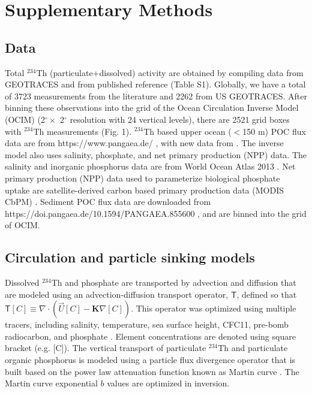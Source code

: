 \section{Supplementary Methods}
\label{sec:meth}

\subsection{Data}
Total $^{234}$Th (particulate+dissolved) activity are obtained by compiling data from GEOTRACES \citep{mawji2015,schlitzer2018} and from published reference (Table S1).
Globally, we have a total of 3723 measurements from the literature and 2262 from US GEOTRACES.
After binning these observations into the grid of the Ocean Circulation Inverse Model (OCIM) (2$^\circ\times$ 2$^\circ$ resolution with 24 vertical levels), there are 2521 grid boxes with $^{234}$Th measurements (Fig. 1).
$^{234}$Th based upper ocean ($<$150 m) POC flux data are from https://www.pangaea.de/ \citep{LeMoigne2013}, with new data from \citet{Black2017}.
The inverse model also uses salinity, phosphate, and net primary production (NPP) data.
The salinity and inorganic phosphorus data are from World Ocean Atlas 2013 \citep{Zweng2013,Garcia2014}.
Net primary production (NPP) data used to parameterize biological phosphate uptake are satellite-derived carbon based primary production data (MODIS CbPM) \citep{Westberry2008}.
Sediment POC flux data are downloaded from https://doi.pangaea.de/10.1594/PANGAEA.855600 \citep{mouw2016}, and are binned into the grid of OCIM.

\subsection{Circulation and particle sinking models}
Dissolved $^{234}$Th and phosphate are transported by advection and diffusion that are modeled using an advection-diffusion transport operator, $\boldsymbol{\mathsf{T}}$, defined so that $\boldsymbol{\mathsf{T}}[C] \equiv \nabla \cdot \left(\vec{U}[C]-\mathbf{K}\nabla [C]\right)$.
This operator was optimized using multiple tracers, including salinity, temperature, sea surface height, CFC11, pre-bomb radiocarbon, and phosphate \citep{DeVries2011,Primeau2013}.
Element concentrations are denoted using square bracket (e.g. [C]).
The vertical transport of particulate $^{234}$Th and particulate organic phosphorus is modeled using a particle flux divergence operator that is built based on the power law attenuation function known as Martin curve \citep{fu2017}.
The Martin curve exponential $b$ values are optimized in inversion.

